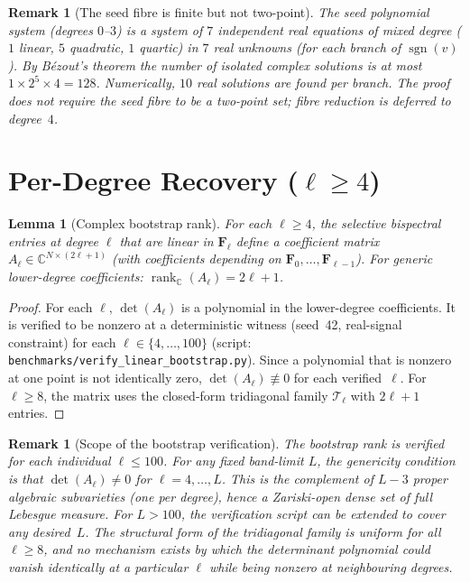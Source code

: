 \documentclass[11pt]{article}
\newtheorem{lemma}[theorem]{Lemma}
\newtheorem{remark}[theorem]{Remark}
\DeclareMathOperator{\sgn}{sgn}
\newcommand{\C}{\mathbb{C}}
\begin{document}
\begin{remark}[The seed fibre is finite but not two-point]
\label{rem:seed-fibre-size}
The seed polynomial system (degrees $0$--$3$) is a system of
$7$ independent real equations of mixed degree ($1$ linear, $5$ quadratic,
$1$ quartic) in $7$ real unknowns (for each branch of $\sgn(v)$).
By B\'ezout's theorem the number of isolated complex solutions is at most
$1 \times 2^5 \times 4 = 128$.
Numerically, $10$ real solutions are found per branch.
The proof does not require the seed fibre to be a two-point set;
fibre reduction is deferred to degree~$4$.
\end{remark}


\section{Per-Degree Recovery ($\ell \ge 4$)}

\begin{lemma}[Complex bootstrap rank]\label{lem:bootstrap-rank}
For each $\ell \ge 4$, the selective bispectral entries at degree $\ell$
that are linear in $\mathbf{F}_\ell$ define a coefficient matrix
$A_\ell \in \C^{N \times (2\ell+1)}$ (with coefficients depending on
$\mathbf{F}_0, \ldots, \mathbf{F}_{\ell-1}$).
For generic lower-degree coefficients:
$\operatorname{rank}_\C(A_\ell) = 2\ell+1$.
\end{lemma}
\begin{proof}
For each $\ell$, $\det(A_\ell)$ is a polynomial in the lower-degree
coefficients.  It is verified to be nonzero at a deterministic
witness (seed~42, real-signal constraint) for each
$\ell \in \{4, \ldots, 100\}$
(script: \texttt{benchmarks/verify\_linear\_bootstrap.py}).
Since a polynomial that is nonzero at one point is not identically zero,
$\det(A_\ell) \not\equiv 0$ for each verified~$\ell$.
For $\ell \ge 8$, the matrix uses the closed-form tridiagonal family
$\mathcal{T}_\ell$ with $2\ell+1$ entries.
\end{proof}

\begin{remark}[Scope of the bootstrap verification]\label{rem:bootstrap-scope}
The bootstrap rank is verified for each individual $\ell \le 100$.
For any fixed band-limit $L$, the genericity condition is that
$\det(A_\ell) \ne 0$ for $\ell = 4, \ldots, L$.
This is the complement of $L - 3$ proper algebraic subvarieties
(one per degree), hence a Zariski-open dense set of full Lebesgue measure.
For $L > 100$, the verification script can be extended to cover any
desired~$L$.  The structural form of the tridiagonal family is uniform
for all $\ell \ge 8$, and no mechanism exists by which the determinant
polynomial could vanish identically at a particular $\ell$ while being
nonzero at neighbouring degrees.
\end{remark}
\end{document}
